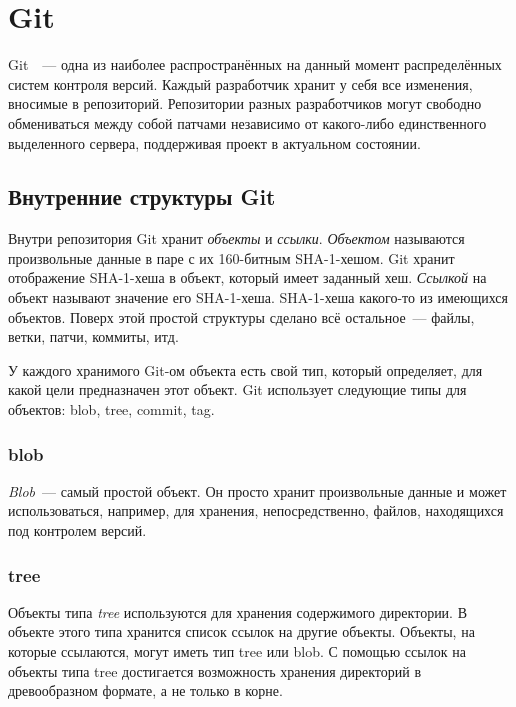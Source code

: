 \section{Git}

Git~\cite{progit,git}~--- одна из наиболее распространённых на данный
момент распределённых систем контроля версий. Каждый разработчик
хранит у себя все изменения, вносимые в репозиторий. Репозитории
разных разработчиков могут свободно обмениваться между собой патчами
независимо от какого-либо единственного выделенного сервера,
поддерживая проект в актуальном состоянии.

\subsection{Внутренние структуры Git}
\label{sec:git-internals}

Внутри репозитория Git хранит \emph{объекты} и \emph{ссылки}.
\emph{Объектом} называются произвольные данные в паре с их 160-битным
SHA-1-хешом. Git хранит отображение SHA-1-хеша в объект, который имеет
заданный хеш. \emph{Ссылкой} на объект называют значение его
SHA-1-хеша. SHA-1-хеша какого-то из имеющихся объектов. Поверх этой
простой структуры сделано всё остальное~--- файлы, ветки, патчи,
коммиты, итд.

У каждого хранимого Git-ом объекта есть свой тип, который определяет,
для какой цели предназначен этот объект. Git использует следующие типы
для объектов: blob, tree, commit, tag.


\subsubsection{blob}

\emph{Blob}~--- самый простой объект. Он просто хранит произвольные
данные и может использоваться, например, для хранения,
непосредственно, файлов, находящихся под контролем версий.

\subsubsection{tree}

Объекты типа \emph{tree} используются для хранения содержимого
директории. В объекте этого типа хранится список ссылок на другие
объекты. Объекты, на которые ссылаются, могут иметь тип tree или blob.
С помощью ссылок на объекты типа tree достигается возможность хранения
директорий в древообразном формате, а не только в корне.

